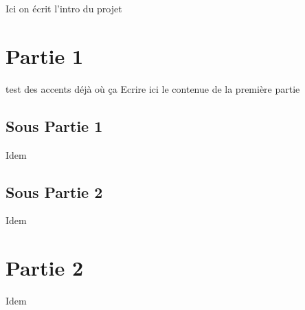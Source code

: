 \documentclass[10pt,a4paper]{article} %
\begin{document}
    \title{\rmfamily\normalfont{}}
    \author{}
    \date{} %
    
    \maketitle
    Ici on écrit l'intro du projet
    \tableofcontents
    
    \section{Partie 1}

    test des accents déjà où ça
    Ecrire ici le contenue de la première partie
    \subsection{Sous Partie 1}
    Idem
    \subsection{Sous Partie 2}
    Idem
    
    \section{Partie 2}
    Idem
    
\end{document}
